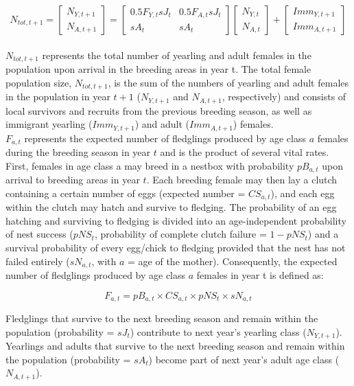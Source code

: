 \documentclass[
]{book}
\begin{document}
\[N_{tot,t+1} = \begin{bmatrix} N_{Y,t+1} \\ N_{A,t+1} \end{bmatrix} =
  \begin{bmatrix}
0.5F_{Y,t}sJ_t & 0.5F_{A,t}sJ_t \\
sA_t & sA_t
\end{bmatrix}\begin{bmatrix} N_{Y,t} \\ N_{A,t} \end{bmatrix} +
  \begin{bmatrix} Imm_{Y,t+1} \\ Imm_{A,t+1} \end{bmatrix}\]\\

\(N_{tot,t+1}\) represents the total number of yearling and adult females in the
population upon arrival in the breeding areas in year t. The total female
population size, \(N_{tot,t+1}\), is the sum of the numbers of yearling and adult
females in the population in year \(t+1\) (\(N_{Y,t+1}\) and \(N_{A,t+1}\),
respectively) and consists of local survivors and recruits from the previous
breeding season, as well as immigrant yearling (\(Imm_{Y,t+1}\)) and adult
(\(Imm_{A,t+1}\)) females.\\

\(F_{a,t}\) represents the expected number of fledglings produced by age class \(a\)
females during the breeding season in year \(t\) and is the product of several
vital rates. First, females in age class a may breed in a nestbox with
probability \(pB_{a,t}\) upon arrival to breeding areas in year \(t\). Each breeding
female may then lay a clutch containing a certain number of eggs (expected
number = \(CS_{a,t}\)), and each egg within the clutch may hatch and survive to
fledging. The probability of an egg hatching and surviving to fledging is
divided into an age-independent probability of nest success (\(pNS_t\),
probability of complete clutch failure = \(1-pNS_t\)) and a survival probability
of every egg/chick to fledging provided that the nest has not failed entirely
(\(sN_{a,t}\), with \(a\) = age of the mother). Consequently, the expected number of
fledglings produced by age class \(a\) females in year t is defined as:

\begin{equation}
F_{a,t}= pB_{a,t}\times CS_{a,t}\times pNS_{t}\times sN_{a,t}
\end{equation}

Fledglings that survive to the next breeding season and remain within the
population (probability = \(sJ_t\)) contribute to next year's yearling class
(\(N_{Y,t+1}\)). Yearlings and adults that survive to the next breeding season and
remain within the population (probability = \(sA_t\)) become part of next year's
adult age class (\(N_{A,t+1}\)).
\end{document}
